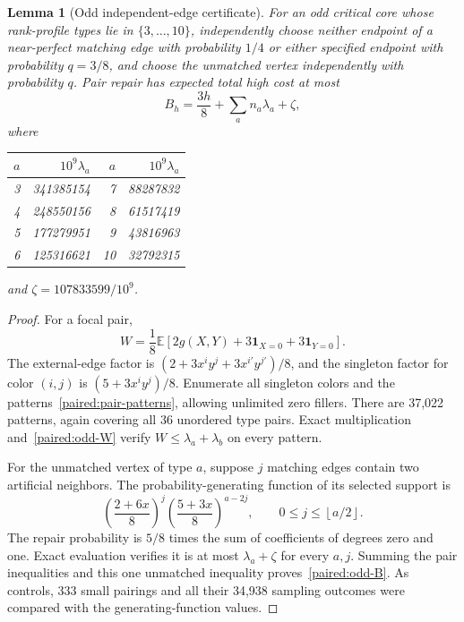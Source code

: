 \documentclass[11pt,a4paper]{article}
\newtheorem{lemma}[theorem]{Lemma}
\theoremstyle{definition}\newtheorem{definition}[theorem]{Definition}
\theoremstyle{remark}\newtheorem{remark}[theorem]{Remark}
\newcommand{\floor}[1]{\left\lfloor#1\right\rfloor}
\begin{document}
\begin{lemma}[Odd independent-edge certificate]\label{paired:odd-table}
For an odd critical core whose rank-profile types lie in
$\{3,\ldots,10\}$, independently choose neither endpoint of a
near-perfect matching edge with probability $1/4$ or either specified
endpoint with probability $q=3/8$, and choose the unmatched vertex
independently with probability $q$. Pair repair has expected total
high cost at most
\begin{equation}\label{paired:odd-B}
 B_h=\frac{3h}{8}+\sum_a n_a\lambda_a+\zeta,
\end{equation}
where
\begin{center}\small
\begin{tabular}{rr@{\qquad}rr}
\toprule
$a$&$10^9\lambda_a$&$a$&$10^9\lambda_a$\\\midrule
3&341385154&7&88287832\\
4&248550156&8&61517419\\
5&177279951&9&43816963\\
6&125316621&10&32792315\\\bottomrule
\end{tabular}
\end{center}
and $\zeta=107833599/10^9$.
\end{lemma}
\begin{proof}
For a focal pair,
\begin{equation}\label{paired:odd-W}
 W=\frac18\mathbb E[2g(X,Y)+3\mathbf1_{X=0}+3\mathbf1_{Y=0}].
\end{equation}
The external-edge factor is
$(2+3x^iy^j+3x^{i'}y^{j'})/8$, and the singleton factor for color
$(i,j)$ is $(5+3x^iy^j)/8$. Enumerate all singleton colors and the
patterns~\eqref{paired:pair-patterns}, allowing unlimited zero fillers.
There are 37,022 patterns, again covering all 36 unordered type
pairs. Exact multiplication and~\eqref{paired:odd-W} verify
$W\le\lambda_a+\lambda_b$ on every pattern.

For the unmatched vertex of type $a$, suppose $j$ matching edges
contain two artificial neighbors. The probability-generating function
of its selected support is
\[
 \left(\frac{2+6x}{8}\right)^j
 \left(\frac{5+3x}{8}\right)^{a-2j},
 \qquad 0\le j\le\floor{a/2}.
\]
The repair probability is $5/8$ times the sum of coefficients of
degrees zero and one. Exact evaluation verifies it is at most
$\lambda_a+\zeta$ for every $a,j$. Summing the pair inequalities
and this one unmatched inequality proves~\eqref{paired:odd-B}.
As controls, 333 small pairings and all their 34,938 sampling outcomes
were compared with the generating-function values.
\end{proof}
\end{document}

